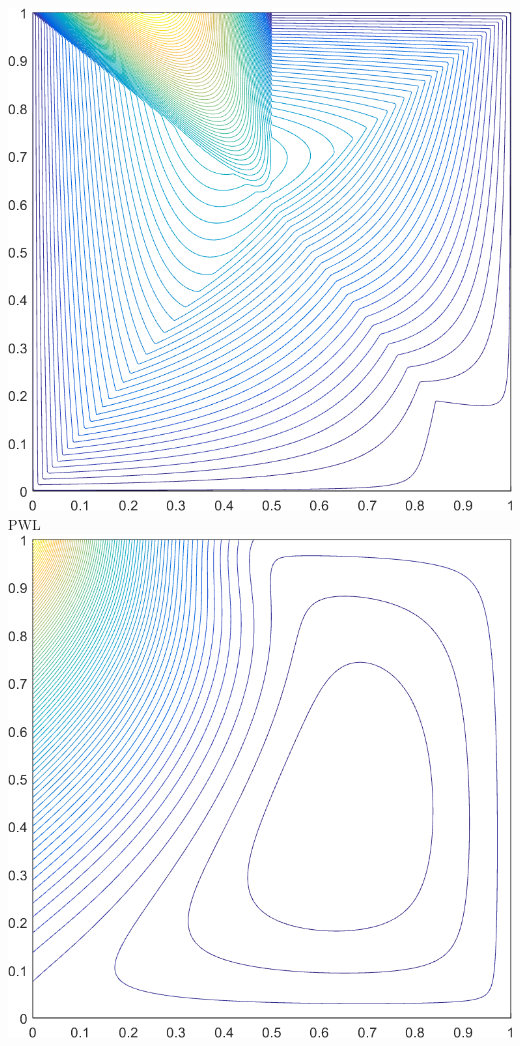 \documentclass[compress,10pt]{beamer}
\begin{document}
\begin{frame}[t]
{\begin{columns}
\vspace{3mm}
{}\includegraphics[width=0.85\columnwidth]{images/deg_square_PWLD2_contour_b9.png} \\
PWL\\ 
\centering
{}\includegraphics[width=0.85\columnwidth]{images/deg_square_MV2_contour_b5.png} \\
\vspace{3mm}

\end{columns}}
\end{frame}
\end{document}

